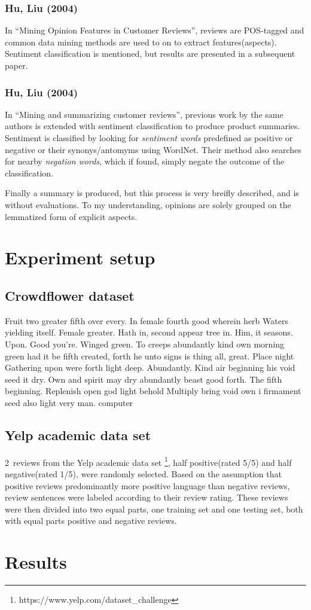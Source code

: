 \documentclass[a4paper,11pt]{kth-mag}
\newcommand{\numClassifiationReviews}{2}
\newcommand{\loremipsum}{
  {\color{lightgray}
  Fruit two greater fifth over every. In female fourth good wherein herb
  Waters yielding itself. Female greater. Hath in, second appear tree in.
  Him, it seasons. Upon. Good you're. Winged green. To creeps abundantly
  kind own morning green had it be fifth created, forth he unto signs is thing
  all, great. Place night Gathering upon were forth light deep. Abundantly.
  Kind air beginning his void seed it dry. Own and spirit may dry abundantly
  beast good forth. The fifth beginning. Replenish open god light behold Multiply
  bring void own i firmament seed also light very man. \gls{computer}

  }
}
\begin{document}
\subsubsection{Hu, Liu (2004)}
In ``Mining Opinion Features in Customer Reviews'', reviews are POS-tagged and common data mining methods are used to on to extract features(aspects). Sentiment classification is mentioned, but results are presented in a subsequent paper.

\subsubsection{Hu, Liu (2004)}
In ``Mining and summarizing customer reviews'', previous work by the same authors is extended with sentiment classification to produce product summaries. Sentiment is classified by looking for \emph{sentiment words} predefined as positive or negative or their synonys/antomyms using WordNet. Their method also searches for nearby \emph{negation words}, which if found, simply negate the outcome of the classification.

Finally a summary is produced, but this process is very breifly described, and is without evaluations. To my understanding, opinions are solely grouped on the lemmatized form of explicit aspects.


\section{Experiment setup}
\subsection{Crowdflower dataset}
\loremipsum

\subsection{Yelp academic data set}
\numClassifiationReviews~reviews from the Yelp academic data set \footnote{https://www.yelp.com/dataset\_challenge}, half positive(rated 5/5) and half negative(rated 1/5), were randomly selected. Based on the assumption that positive reviews predominantly more positive language than negative reviews, review sentences were labeled according to their review rating. These reviews were then divided into two equal parts, one training set and one testing set, both with equal parts positive and negative reviews.


\newpage
\section{Results}
\end{document}
